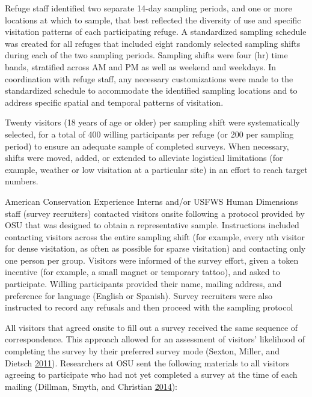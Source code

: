 \documentclass[]{book}
\begin{document}
Refuge staff identified two separate 14-day sampling periods, and one or
more locations at which to sample, that best reflected the diversity of
use and specific visitation patterns of each participating refuge. A
standardized sampling schedule was created for all refuges that included
eight randomly selected sampling shifts during each of the two sampling
periods. Sampling shifts were four (hr) time bands, stratified across AM
and PM as well as weekend and weekdays. In coordination with refuge
staff, any necessary customizations were made to the standardized
schedule to accommodate the identified sampling locations and to address
specific spatial and temporal patterns of visitation.

Twenty visitors (18 years of age or older) per sampling shift were
systematically selected, for a total of 400 willing participants per
refuge (or 200 per sampling period) to ensure an adequate sample of
completed surveys. When necessary, shifts were moved, added, or extended
to alleviate logistical limitations (for example, weather or low
visitation at a particular site) in an effort to reach target numbers.

American Conservation Experience Interns and/or USFWS Human Dimensions
staff (survey recruiters) contacted visitors onsite following a protocol
provided by OSU that was designed to obtain a representative sample.
Instructions included contacting visitors across the entire sampling
shift (for example, every nth visitor for dense visitation, as often as
possible for sparse visitation) and contacting only one person per
group. Visitors were informed of the survey effort, given a token
incentive (for example, a small magnet or temporary tattoo), and asked
to participate. Willing participants provided their name, mailing
address, and preference for language (English or Spanish). Survey
recruiters were also instructed to record any refusals and then proceed
with the sampling protocol

All visitors that agreed onsite to fill out a survey received the same
sequence of correspondence. This approach allowed for an assessment of
visitors' likelihood of completing the survey by their preferred survey
mode (Sexton, Miller, and Dietsch
\protect\hyperlink{ref-sexton2011}{2011}). Researchers at OSU sent the
following materials to all visitors agreeing to participate who had not
yet completed a survey at the time of each mailing (Dillman, Smyth, and
Christian \protect\hyperlink{ref-dillman2014}{2014}):
\end{document}
